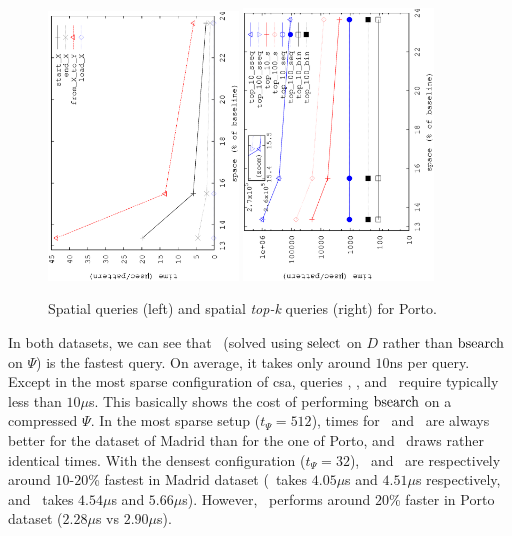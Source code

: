 \begin{figure}[ht]
		\begin{center}
			{\includegraphics[angle=-90,width=0.45\textwidth]{figures_synt/porto_spatial.eps}}
			{\includegraphics[angle=-90,width=0.45\textwidth]{figures_synt/porto_spatial_topk.eps}}
		\end{center}
		\caption{Spatial queries (left) and spatial {\em top-k} queries (right) for Porto.}
		\label{fig:ctr:exp:queries:spat:porto}
	\end{figure}

	In both datasets, we can see that \loadX\ (solved using $\operatorname{select}$ on $D$ rather than
	$\operatorname{bsearch}$ on $\Psi$) is the fastest query. On average, it takes only around $10$ns
	per query. Except in the most sparse configuration of \gls{csa}, queries \endX, \startX, and 
	\XtoY\ require typically less than $10\mu$s. This basically shows the cost of performing
	$\operatorname{bsearch}$ on a compressed $\Psi$. In the most sparse setup ($t_{\Psi}=512$), times for \startX\ and \XtoY\ are always better 
	for the dataset of Madrid than for the one of Porto, and \endX\ draws rather identical times.
	With the densest configuration  ($t_{\Psi}=32$), \endX\ and \XtoY\ are respectively 
	around $10$-$20$\% fastest in Madrid dataset (\endX\ takes $4.05\mu$s and $4.51\mu$s respectively, and
	\XtoY\ takes $4.54\mu$s and $5.66\mu$s). However, \startX\ performs around $20$\% faster in Porto dataset 
	($2.28\mu$s vs $2.90\mu$s).
	\medskip

